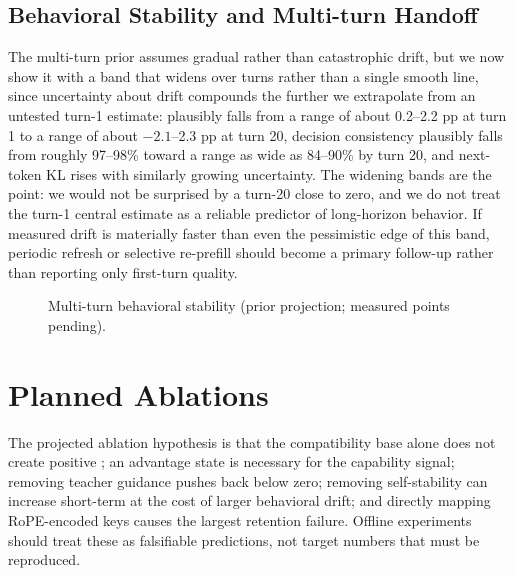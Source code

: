 \documentclass[10pt]{article}
\newcommand{\chg}{\text{CHG}}
\begin{document}
\subsection{Behavioral Stability and Multi-turn Handoff}
The multi-turn prior assumes gradual rather than catastrophic drift, but we now show it with a band
that widens over turns rather than a single smooth line, since uncertainty about drift compounds
the further we extrapolate from an untested turn-1 estimate: \chg{} plausibly falls from a range
of about 0.2--2.2 pp at turn 1 to a range of about $-2.1$--2.3 pp at turn 20, decision
consistency plausibly falls from roughly 97--98\% toward a range as wide as 84--90\% by turn 20,
and next-token KL rises with similarly growing uncertainty. The widening bands are the point: we
would not be surprised by a turn-20 \chg{} close to zero, and we do not treat the turn-1 central
estimate as a reliable predictor of long-horizon behavior. If measured drift is materially faster
than even the pessimistic edge of this band, periodic refresh or selective re-prefill should
become a primary follow-up rather than reporting only first-turn quality.

\begin{figure}[t]
\centering
{}
\caption{Multi-turn behavioral stability (prior projection; measured points pending).}
\label{fig:multiturn}
\end{figure}

\section{Planned Ablations}
The projected ablation hypothesis is that the compatibility base alone does not create positive
\chg; an advantage state is necessary for the capability signal; removing teacher guidance pushes
\chg{} back below zero; removing self-stability can increase short-term \chg{} at the cost of
larger behavioral drift; and directly mapping RoPE-encoded keys causes the largest retention
failure. Offline experiments should treat these as falsifiable predictions, not target numbers
that must be reproduced.
\end{document}
